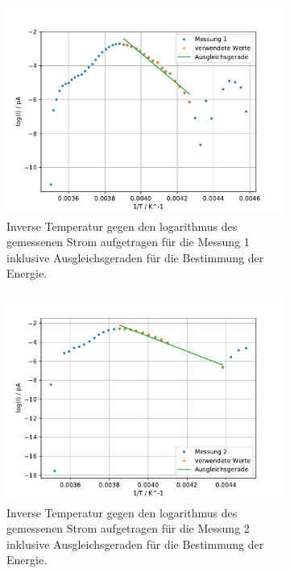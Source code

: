 \begin{figure}
  
  \centering
  \begin{subfigure}[b]{0.75\textwidth}
      \centering
      \includegraphics[width=\textwidth]{build_j/log(I)_1durchT_1.pdf}
      \caption{Inverse Temperatur gegen den logarithmus des gemessenen Strom aufgetragen für die Messung 1 inklusive Ausgleichsgeraden für die Bestimmung der Energie.}
  \end{subfigure}
  \hfill
  \begin{subfigure}[b]{0.75\textwidth}
      \centering
      \includegraphics[width=\textwidth]{build_j/log(I)_1durchT_2.pdf}
      \caption{Inverse Temperatur gegen den logarithmus des gemessenen Strom aufgetragen für die Messung 2 inklusive Ausgleichsgeraden für die Bestimmung der Energie.}
  \end{subfigure}
  \caption{}
  \label{fig:int}
\end{figure}

